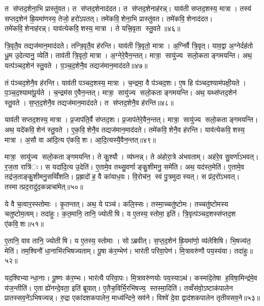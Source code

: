 त स॑प्तद॒शेना॒भि प्रास्तु॑वत। त स॑प्तद॒शेनाद॑दत। त स॑प्तद॒शेनाह॑रन्न्। याव॑ती सप्तद॒शस्य॒ मात्रा। तस्य॑ सप्तद॒शेन॑ ह्रि॒यमा॑णस्य॒ तेजो॒ हरो॑ऽपतत्। तमे॑कवि॒शेना॒भि प्रास्तु॑वत। तमे॑कवि॒शेनाद॑दत। तमे॑कवि॒शेनाह॑रन्न्। याव॑त्येकवि॒शस्य॒ मात्रा। ते यत्त्रि॒वृता स्तु॒वते॥४६॥

त्रि॒वृतै॒व तद्यज॑मान॒माद॑दते। तन्त्रि॒वृतै॒व ह॑रन्ति। याव॑ती त्रि॒वृतो॒ मात्रा। अ॒ग्निर्वै त्रि॒वृत्। याव॒द्वा अ॒ग्नेर्दह॑तो धू॒म उ॒देत्यानु॒ व्येति॑। ताव॑ती त्रि॒वृतो॒ मात्रा। अ॒ग्नेरे॒वैन॒न्तत्। मात्रा॒ सायु॑ज्य सलो॒कताङ्गमयन्ति। अथ॒ यत्प॑ञ्चद॒शेन॑ स्तु॒वते। प॒ञ्च॒द॒शेनै॒व तद्यज॑मान॒माद॑दते॥४७॥

तं प॑ञ्चद॒शेनै॒व ह॑रन्ति। याव॑ती पञ्चद॒शस्य॒ मात्रा। च॒न्द्रमा॒ वै प॑ञ्चद॒शः। ए॒ष हि प॑ञ्चद॒श्याम॑पक्षी॒यते। प॒ञ्च॒द॒श्यामा॑पू॒र्यते। च॒न्द्रम॑स ए॒वैन॒न्तत्। मात्रा॒ सायु॑ज्य सलो॒कताङ्गमयन्ति। अथ॒ यथ्स॑प्तद॒शेन॑ स्तु॒वते। स॒प्त॒द॒शेनै॒व तद्यज॑मान॒माद॑दते। त स॑प्तद॒शेनै॒व ह॑रन्ति॥४८॥

याव॑ती सप्तद॒शस्य॒ मात्रा। प्र॒जाप॑ति॒र्वै स॑प्तद॒शः। प्र॒जाप॑तेरे॒वैन॒न्तत्। मात्रा॒ सायु॑ज्य सलो॒कताङ्गमयन्ति। अथ॒ यदे॑कवि॒शेन॑ स्तु॒वते। ए॒क॒वि॒शेनै॒व तद्यज॑मान॒माद॑दते। तमे॑कवि॒शेनै॒व ह॑रन्ति। याव॑त्येकवि॒शस्य॒ मात्रा। अ॒सौ वा आ॑दि॒त्य ए॑कवि॒शः। आ॒दि॒त्यस्यै॒वैन॒न्तत्॥४९॥

मात्रा॒ सायु॑ज्य सलो॒कताङ्गमयन्ति। ते कु॒श्यौ। व्य॑घ्नन्न्। ते अ॑होरा॒त्रे अ॑भवताम्। अह॑रे॒व सु॒वर्णा॑ऽभवत्। र॒ज॒ता रात्रि॑ः। स यदा॑दि॒त्य उ॒देति॑। ए॒तामे॒व तथ्सु॒वर्णाङ्कु॒शीमनु॒ समे॑ति। अथ॒ यद॑स्त॒मेति॑। ए॒तामे॒व तद्र॑ज॒ताङ्कु॒शीमनु॒सव्विँ॑शति। प्र॒ह्रादो॑ ह॒ वै का॑याध॒वः। वि॒रोच॑न॒ स्वं पु॒त्रमुदास्यत्। स प्र॑द॒रो॑ऽभवत्। तस्मात्प्रद॒रादु॑द॒कन्नाचा॑मेत्॥५०॥


ये वै च॒त्वार॒स्स्तोमाः। कृ॒तन्तत्। अथ॒ ये पञ्च॑। कलि॒स्सः। तस्मा॒च्चतु॑ष्टोमः। तच्चतु॑ष्टोमस्य चतुष्टोम॒त्वम्। तदा॑हुः। क॒त॒मानि॒ तानि॒ ज्योतीषि। य ए॒तस्य॒ स्तोमा॒ इति॑। त्रि॒वृत्प॑ञ्चद॒शस्स॑प्तद॒श ए॑कवि॒शः॥५१॥

ए॒तानि॒ वाव तानि॒ ज्योतीषि। य ए॒तस्य॒ स्तोमाः। सोऽब्रवीत्। स॒प्त॒द॒शेन॑ ह्रि॒यमा॑णो॒ व्य॑लेशिषि। भि॒षज्य॑त॒ मेति॑। तम॒श्विनौ॑ धा॒नाभि॑रभिषज्यताम्। पू॒षा क॑र॒म्भेण॑। भार॑ती परिवा॒पेण॑। मि॒त्रावरु॑णौ पय॒स्य॑या। तदा॑हुः॥५२॥

यद॒श्विभ्यान्धा॒नाः। पू॒ष्णः क॑र॒म्भः। भार॑त्यै परिवा॒पः। मि॒त्रावरु॑णयोः पय॒स्याऽथ॑। कस्मा॑दे॒तेषा ह॒विषा॒मिन्द्र॑मे॒व य॑ज॒न्तीति॑। ए॒ता ह्ये॑नन्दे॒वता॒ इति॑ ब्रूयात्। ए॒तैऱ्ह॒विर्भि॒रभि॑षज्य॒ स्तस्मा॒दिति॑। तव्वँस॑वो॒ऽष्टाक॑पालेन प्रातस्सव॒ने॑ऽभिषज्यन्न्। रु॒द्रा एका॑दशकपालेन॒ माध्य॑न्दिने॒ सव॑ने। विश्वे॑ दे॒वा द्वाद॑शकपालेन तृतीयसव॒ने॥५३॥


